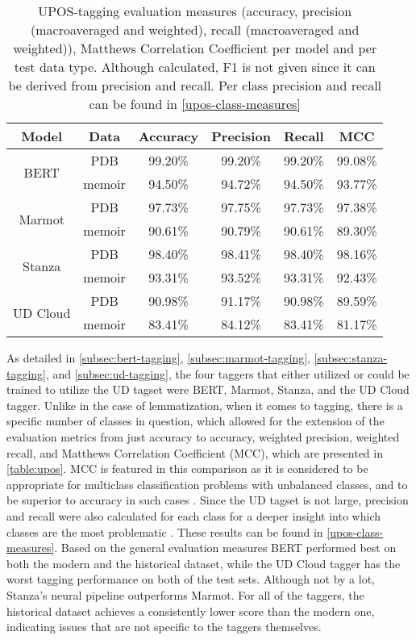 \renewcommand{\arraystretch}{1.25}
\begin{table}[H]
\begin{center}
\begin{tabular}{|cc|cccc|}
\hline \bf Model & \bf Data & \bf Accuracy & \bf Precision & \bf Recall & \bf MCC \\ \hline
\multirow{2}{4em}{BERT}
& PDB & 99.20\% & 99.20\% & 99.20\% & 99.08\% \\
& memoir & 94.50\% & 94.72\% & 94.50\% & 93.77\%  \\
\multirow{2}{4em}{Marmot}
& PDB & 97.73\% & 97.75\% & 97.73\% & 97.38\% \\
& memoir & 90.61\% & 90.79\% & 90.61\% & 89.30\% \\
\multirow{2}{4em}{Stanza}
& PDB & 98.40\% & 98.41\% & 98.40\% & 98.16\% \\
& memoir & 93.31\% & 93.52\% & 93.31\% & 92.43\% \\
\multirow{2}{4em}{UD Cloud}
& PDB & 90.98\% & 91.17\% & 90.98\% & 89.59\% \\
& memoir & 83.41\% & 84.12\% & 83.41\% & 81.17\% \\ 
\hline
\end{tabular}
\caption{\label{table:upos} UPOS-tagging evaluation measures (accuracy, precision (macroaveraged and weighted), recall (macroaveraged and weighted)), Matthews Correlation Coefficient per model and per test data type. Although calculated, F1 is not given since it can be derived from precision and recall. Per class precision and recall can be found in \autoref{upos-class-measures}}
\end{center}
\end{table}

As detailed in \autoref{subsec:bert-tagging}, \autoref{subsec:marmot-tagging}, \autoref{subsec:stanza-tagging}, and \autoref{subsec:ud-tagging}, the four taggers that either utilized or could be trained to utilize the UD tagset were BERT, Marmot, Stanza, and the UD Cloud tagger. Unlike in the case of lemmatization, when it comes to tagging, there is a specific number of classes in question, which allowed for the extension of the evaluation metrics from just accuracy to accuracy, weighted precision, weighted recall, and Matthews Correlation Coefficient (MCC), which are presented in \autoref{table:upos}. MCC is featured in this comparison as it is considered to be appropriate for multiclass classification problems with unbalanced classes, and to be superior to accuracy in such cases \citep{matthewscc}. Since the UD tagset is not large, precision and recall were also calculated for each class for a deeper insight into which classes are the most problematic \citep{ud-tagset}. These results can be found in \autoref{upos-class-measures}. Based on the general evaluation measures BERT performed best on both the modern and the historical dataset, while the UD Cloud tagger has the worst tagging performance on both of the test sets. Although not by a lot, Stanza's neural pipeline outperforms Marmot. For all of the taggers, the historical dataset achieves a consistently lower score than the modern one, indicating issues that are not specific to the taggers themselves. 

